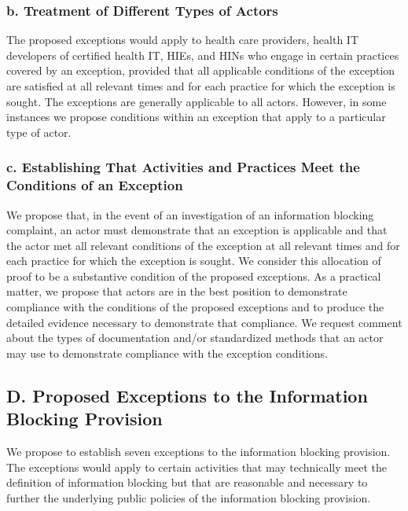 \documentclass[twoside,11pt]{article}
\begin{document}
          \subsubsection{b. Treatment of Different Types of Actors}

          The proposed exceptions would apply to health care providers, health IT developers of certified health IT, HIEs, and HINs who engage in certain practices covered by an exception, provided that all applicable conditions of the exception are satisfied at all relevant times and for each practice for which the exception is sought. The exceptions are generally applicable to all actors. However, in some instances we propose conditions within an exception that apply to a particular type of actor.


          \subsubsection{c. Establishing That Activities and Practices Meet the Conditions of an Exception}

          We propose that, in the event of an investigation of an information blocking complaint, an actor must demonstrate that an exception is applicable and that the actor met all relevant conditions of the exception at all relevant times and for each practice for which the exception is sought. We consider this allocation of proof to be a substantive condition of the proposed exceptions. As a practical matter, we propose that actors are in the best position to demonstrate compliance with the conditions of the proposed exceptions and to produce the detailed evidence necessary to demonstrate that compliance. We request comment about the types of documentation and/or standardized methods that an actor may use to demonstrate compliance with the exception conditions.


          \subsection{D. Proposed Exceptions to the Information Blocking Provision}

          We propose to establish seven exceptions to the information blocking provision. The exceptions would apply to certain activities that may technically meet the definition of information blocking but that are reasonable and necessary to further the underlying public policies of the information blocking provision.
\end{document}
